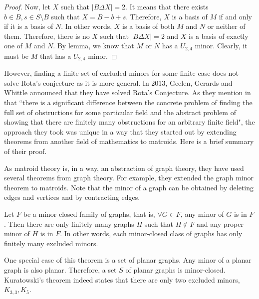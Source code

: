 \begin{proof}
Now, let $X$ such that $\lvert B \Delta X \rvert = 2$.
It means that there exists $b \in B, s \in S \setminus B$ such that $X = B - b + s$.
Therefore, $X$ is a basis of $M$ if and only if it is a basis of $N$.
In other words, $X$ is a basis of both $M$ and $N$ or neither of them.
Therefore, there is no $X$ such that $\lvert B \Delta X \rvert = 2$ and $X$ is a basis of exactly one of $M$ and $N$.
By lemma, we know that $M$ or $N$ has a $U_{2, 4}$ minor.
Clearly, it must be $M$ that has a $U_{2, 4}$ minor.
\end{proof}

However, finding a finite set of excluded minors for some finite case does not solve Rota's conjecture as it is more general.
In 2013, Geelen, Gerards and Whittle announced that they have solved Rota's Conjecture.
As they mention in \cite{solving} that ``there is a significant difference between the concrete problem of finding the full set of obstructions for some particular field and the abstract problem of showing that there are finitely many obstructions for an arbitrary finite field",
the approach they took was unique in a way that they started out by extending theorems from another field of mathematics to matroids.
Here is a brief summary of their proof.

As matroid theory is, in a way, an abstraction of graph theory, they have used several theorems from graph theory.
For example, they extended the graph minor theorem to matroids.
Note that the minor of a graph can be obtained by deleting edges and vertices and by contracting edges.

\begin{thm}
Let $F$ be a minor-closed family of graphs, that is, $\forall G \in F$, any minor of $G$ is in $F$.
Then there are only finitely many graphs $H$ such that $H \notin F$ and any proper minor of $H$ is in $F$.
In other words, each minor-closed class of graphs has only finitely many excluded minors.
\end{thm}

One special case of this theorem is a set of planar graphs.
Any minor of a planar graph is also planar.
Therefore, a set $S$ of planar graphs is minor-closed.
Kuratowski's theorem indeed states that there are only two excluded minors, $K_{3, 3}, K_5$.

